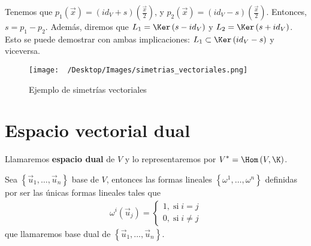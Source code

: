 \begin{observation}
\normalfont Tenemos que $\displaystyle p_{1}\left(\vec{x}\right) = \left(id _{V}+ s\right)\left(\frac{\vec{x}}{2}\right) $, y $\displaystyle p_{2}\left(\vec{x}\right) = \left(id _{V} - s\right)\left(\frac{\vec{x}}{2}\right) $. Entonces, $\displaystyle s = p_{1}-p_{2} $. Además, diremos que $\displaystyle L_{1} = \Ker\left(s-id _{V}\right) $ y $\displaystyle L_{2} = \Ker\left(s+id _{V}\right) $. Esto se puede demostrar con ambas implicaciones: $\displaystyle L_{1} \subset \Ker\left(id _{V}-s\right) $ y viceversa.
\end{observation}

\begin{figure}
\centering
\texttt{[image: ~/Desktop/Images/simetrias\_vectoriales.png]}
\caption{Ejemplo de simetrías vectoriales}
\end{figure}

\section{Espacio vectorial dual}

\begin{fdefinition}
\normalfont Llamaremos \textbf{espacio dual}  de $\displaystyle V $ y lo representaremos por $\displaystyle V^{*} = \Hom\left(V, \K\right) $.
\end{fdefinition}

\begin{ftheorem}[]
	\normalfont Sea $\displaystyle \left\{ \vec{u}_{1}, \ldots, \vec{u}_{n}\right\}  $ base de $\displaystyle V $, entonces las formas lineales $\displaystyle \left\{ \omega^{1}, \ldots, \omega^{n}\right\}  $ definidas por ser las únicas formas lineales tales que 
\[
\begin{split}
 \omega^{i}\left(\vec{u}_{j}\right) = 
\begin{cases}
1, \; \text{si} \; i = j \\
0, \; \text{si} \; i \neq j
\end{cases}
\end{split}
\]
que llamaremos base dual de $\displaystyle \left\{ \vec{u}_{1}, \ldots, \vec{u}_{n}\right\}  $.
\end{ftheorem}

